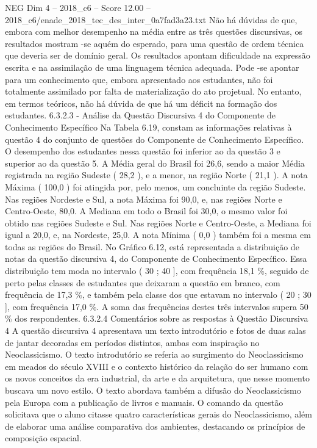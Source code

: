\begin{textsample}{NEG Dim 4 – 2018\_c6 – Score 12.00 – 2018\_c6/enade\_2018\_tec\_des\_inter\_0a7fad3a23.txt}
Não há dúvidas de que, embora com melhor desempenho na média entre as três questões discursivas, os resultados mostram -se aquém do esperado, para uma questão de ordem técnica que deveria ser de domínio geral.
Os resultados apontam dificuldade na expressão escrita e na assimilação de uma linguagem técnica adequada.
Pode -se apontar para um conhecimento que, embora apresentado aos estudantes, não foi totalmente assimilado por falta de materialização do ato projetual.
No entanto, em termos teóricos, não há dúvida de que há um déficit na formação dos estudantes. 6.3.2.3 - Análise da Questão Discursiva 4 do Componente de Conhecimento Específico Na Tabela 6.19, constam as informações relativas à questão 4 do conjunto de questões do Componente de Conhecimento Específico.
O desempenho dos estudantes nessa questão foi inferior ao da questão 3 e superior ao da questão 5.
A Média geral do Brasil foi 26,6, sendo a maior Média registrada na região Sudeste ( 28,2 ), e a menor, na região Norte ( 21,1 ).
A nota Máxima ( 100,0 ) foi atingida por, pelo menos, um concluinte da região Sudeste.
Nas regiões Nordeste e Sul, a nota Máxima foi 90,0, e, nas regiões Norte e Centro-Oeste, 80,0.
A Mediana em todo o Brasil foi 30,0, o mesmo valor foi obtido nas regiões Sudeste e Sul.
Nas regiões Norte e Centro-Oeste, a Mediana foi igual a 20,0, e, na Nordeste, 25,0.
A nota Mínima ( 0,0 ) também foi a mesma em todas as regiões do Brasil.
No Gráfico 6.12, está representada a distribuição de notas da questão discursiva 4, do Componente de Conhecimento Específico.
Essa distribuição tem moda no intervalo ( 30 ; 40 ], com frequência 18,1 \%, seguido de perto pelas classes de estudantes que deixaram a questão em branco, com frequência de 17,3 \%, e também pela classe dos que estavam no intervalo ( 20 ; 30 ], com frequência 17,0 \%.
A soma das frequências destes três intervalos supera 50 \% dos respondentes. 6.3.2.4 Comentários sobre as respostas à Questão Discursiva 4 A questão discursiva 4 apresentava um texto introdutório e fotos de duas salas de jantar decoradas em períodos distintos, ambas com inspiração no Neoclassicismo.
O texto introdutório se referia ao surgimento do Neoclassicismo em meados do século XVIII e o contexto histórico da relação do ser humano com os novos conceitos da era industrial, da arte e da arquitetura, que nesse momento buscava um novo estilo.
O texto abordava também a difusão do Neoclassicismo pela Europa com a publicação de livros e manuais.
O comando da questão solicitava que o aluno citasse quatro características gerais do Neoclassicismo, além de elaborar uma análise comparativa dos ambientes, destacando os princípios de composição espacial.

\end{textsample}
